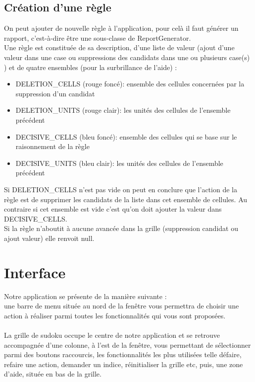 \subsection{Création d’une règle}
On peut ajouter de nouvelle règle à l’application, pour celà il faut générer un rapport, 
c’est-à-dire être une sous-classe de ReportGenerator.\\
Une règle est constituée de sa description, d’une liste de valeur (ajout d’une valeur dans 
une case ou suppressions des candidats dans une ou plusieurs case(s) ) et de quatre ensembles 
(pour la surbrillance de l’aide) : 
\begin{itemize}
\item DELETION\_CELLS (rouge foncé): ensemble des cellules concernées par la suppression d’un candidat
\item DELETION\_UNITS (rouge clair): les unités des cellules de l'ensemble précédent
\item DECISIVE\_CELLS (bleu foncé): ensemble des cellules qui se base sur le raisonnement de la règle
\item DECISIVE\_UNITS (bleu clair): les unités des cellules de l'ensemble précédent
\end{itemize}
Si DELETION\_CELLS n’est pas vide on peut en conclure que l’action de la règle est de supprimer 
les candidats de la liste dans cet ensemble de cellules. Au contraire si cet ensemble est vide 
c’est qu’on doit ajouter la valeur  dans DECISIVE\_CELLS.\\
Si la règle n’aboutit à aucune avancée dans la grille (suppression candidat ou ajout valeur) 
elle renvoit null.


\newpage
\section{Interface}

Notre application se présente de la manière suivante :\\
une barre de menu située au nord de la fenêtre vous permettra de choisir 
une action à réaliser parmi toutes les fonctionnalités qui vous sont proposées.\\
\\
La grille de sudoku occupe le centre de notre application et se retrouve accompagnée 
d'une colonne, à l'est de la fenêtre, vous permettant de sélectionner 
parmi des boutons raccourcis, les fonctionnalités les plus utilisées telle défaire, 
refaire une action, demander un indice, réinitialiser la grille etc, puis, 
une zone d'aide, située en bas de la grille.\\

